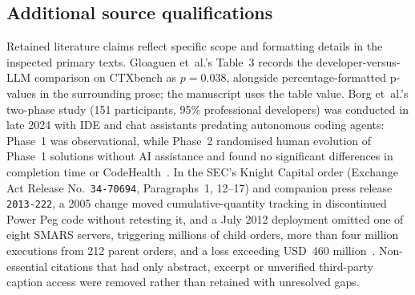 \subsection{Additional source qualifications}\label{app:additionalevidence}

Retained literature claims reflect specific scope and formatting details in
the inspected primary texts. Gloaguen et~al.'s Table~3 records the
developer-versus-LLM comparison on CTXbench as $p=0.038$, alongside
percentage-formatted p-values in the surrounding prose; the manuscript uses
the table value. Borg et~al.'s two-phase study (151 participants, 95\%
professional developers) was conducted in late 2024 with IDE and chat
assistants predating autonomous coding agents: Phase~1 was observational,
while Phase~2 randomised human evolution of Phase~1 solutions without AI
assistance and found no significant differences in completion time or
CodeHealth~\cite[Secs.~1, 2.2, 4]{borg2025echoes}. In the SEC's Knight
Capital order (Exchange Act Release No.~\nolinkurl{34-70694}, Paragraphs~1, 12--17) and
companion press release \nolinkurl{2013-222}, a 2005 change moved cumulative-quantity
tracking in discontinued Power Peg code without retesting it, and a July
2012 deployment omitted one of eight SMARS servers, triggering millions of
child orders, more than four million executions from 212 parent orders, and
a loss exceeding USD~460 million~\cite{sec2013knight}. Non-essential
citations that had only abstract, excerpt or unverified third-party caption
access were removed rather than retained with unresolved gaps.

